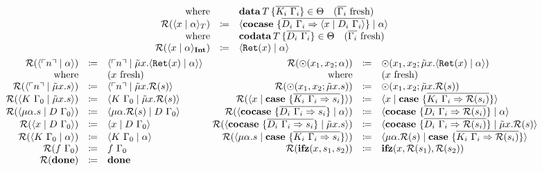 \begin{gather*}
\begin{array}{rcl}
    \text{where} &  & \data{T}{\overline{K_i\ \Gamma_i}} \in \Theta \quad \fresh{\overline{\Gamma_i}} \\
    \redundancy{\cut{x}{\alpha}_T} & \coloneq & \cut{\cocase{\overline{D_i\ \Gamma_i \Rightarrow \cut{x}{D_i\ \Gamma_i}}}}{\alpha} \\
    \text{where} &  & \codata{T}{\overline{D_i\ \Gamma_i}} \in \Theta \quad \fresh{\overline{\Gamma_i}} \\
    \redundancy{\cut{x}{\alpha}_\tyint} & \coloneq & \cut{\mathtt{Ret}(x)}{\alpha} \\
  \end{array}
  \\
  \begin{array}{rclrcl}
    \redundancy{\cut{\lit{n}}{\alpha}} & \coloneq & \cut{\lit{n}}{\tilde{\mu}x.\cut{\mathtt{Ret}(x)}{\alpha}} &
    \redundancy{\odot(x_1, x_2; \alpha)}{} & \coloneq & \odot(x_1, x_2; \tilde{\mu}x.\cut{\mathtt{Ret}(x)}{\alpha}) \\
    \text{where} &  & \fresh{x} &
    \text{where} &  & \fresh{x} \\
    \redundancy{\cut{\lit{n}}{\tilde{\mu}x.s}} & \coloneq & \cut{\lit{n}}{\tilde{\mu}x.\redundancy{s}} &
    \redundancy{\odot(x_1, x_2; \tilde{\mu}x.s)}{} & \coloneq & \odot(x_1, x_2; \tilde{\mu}x.\redundancy{s}) \\
    \redundancy{\cut{K\ \Gamma_0}{\tilde{\mu}x.s}} & \coloneq & \cut{K\ \Gamma_0}{\tilde{\mu}x.\redundancy{s}} &
    \redundancy{\cut{x}{\case{\overline{K_i\ \Gamma_i \Rightarrow s_i}}}} & \coloneq & \cut{x}{\case{\overline{K_i\ \Gamma_i \Rightarrow \redundancy{s_i}}}} \\
    \redundancy{\cut{\mu\alpha.s}{D\ \Gamma_0}} & \coloneq & \cut{\mu\alpha.\redundancy{s}}{D\ \Gamma_0} &
    \redundancy{\cut{\cocase{\overline{D_i\ \Gamma_i \Rightarrow s_i}}}{\alpha}} & \coloneq & \cut{\cocase{\overline{D_i\ \Gamma_i \Rightarrow \redundancy{s_i}}}}{\alpha} \\
    \redundancy{\cut{x}{D\ \Gamma_0}} & \coloneq & \cut{x}{D\ \Gamma_0} &
    \redundancy{\cut{\cocase{\overline{D_i\ \Gamma_i \Rightarrow s_i}}}{\tilde{\mu}x.s}} & \coloneq & \cut{\cocase{\overline{D_i\ \Gamma_i \Rightarrow \redundancy{s_i}}}}{\tilde{\mu}x.\redundancy{s}} \\
    \redundancy{\cut{K\ \Gamma_0}{\alpha}} & \coloneq & \cut{K\ \Gamma_0}{\alpha} &
    \redundancy{\cut{\mu\alpha.s}{\case{\overline{K_i\ \Gamma_i \Rightarrow s_i}}}} & \coloneq & \cut{\mu\alpha.\redundancy{s}}{\case{\overline{K_i\ \Gamma_i \Rightarrow \redundancy{s_i}}}} \\
    \redundancy{f\ \Gamma_0}{} & \coloneq & f\ \Gamma_0 &
    \redundancy{\ifz{x}{s_1}{s_2}}{} & \coloneq & \ifz{x}{\redundancy{s_1}}{\redundancy{s_2}} \\
    \redundancy{\done}{} & \coloneq & \done & & & \\
  \end{array}
\end{gather*}
